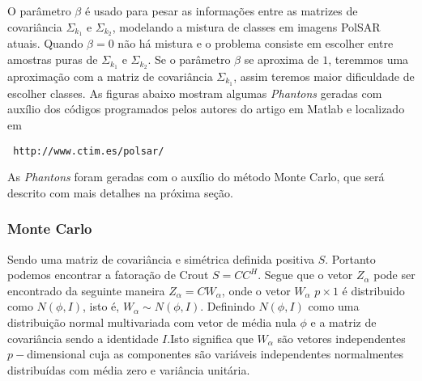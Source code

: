 O parâmetro $\beta$ é usado para pesar as informações entre as matrizes de covariância $\Sigma_{k_1}$ e $\Sigma_{k_2}$, modelando a mistura de classes em imagens PolSAR atuais. Quando $\beta=0$ não há mistura e o problema consiste em escolher entre amostras puras de $\Sigma_{k_1}$ e $\Sigma_{k_2}$. Se o parâmetro $\beta$ se aproxima de $1$, teremmos uma aproximação com a matriz de covariância $\Sigma_{k_1}$, assim teremos maior dificuldade de escolher classes. As figuras abaixo mostram algumas {\it Phantons} geradas com auxílio dos códigos programados pelos autores do artigo em Matlab e localizado em  \begin{verbatim} http://www.ctim.es/polsar/\end{verbatim}


As {\it Phantons} foram geradas com o auxílio do método Monte Carlo, 
que será descrito com mais detalhes na próxima seção.

\subsubsection{Monte Carlo \cite{odell}}

Sendo uma matriz de covariância e simétrica definida positiva $S$. Portanto podemos encontrar a fatoração de Crout $S=CC^H$. Segue que o vetor $Z_{\alpha}$ pode ser encontrado da seguinte maneira $Z_{\alpha}=CW_{\alpha}$, onde o vetor $W_{\alpha}$ $p\times 1$ é distribuido como $N(\phi,I)$, isto é, $W_{\alpha}\sim N(\phi,I)$. Definindo $N(\phi,I)$ como uma distribuição normal multivariada com vetor de média nula $\phi$ e a matriz de covariância sendo a identidade $I$.Isto significa que $W_{\alpha}$ são vetores independentes $p-$dimensional cuja as componentes são variáveis independentes normalmentes distribuídas com média zero e variância unitária. 


